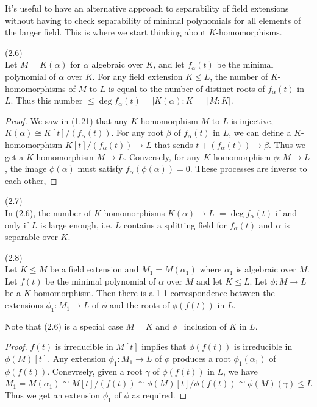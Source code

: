 \documentclass[a4paper]{article}
\begin{document}
\begin{rem}
It's useful to have an alternative approach to separability of field extensions without having to check separability of minimal polynomials for all elements of the larger field. This is where we start thinking about $K$-homomorphisms.
\end{rem}

\begin{lemma} (2.6)\\
Let $M = K(\alpha)$ for $\alpha$ algebraic over $K$, and let $f_\alpha(t)$ be the minimal polynomial of $\alpha$ over $K$. For any field extension $K \leq L$, the number of $K$-homomorphisms of $M$ to $L$ is equal to the number of distinct roots of $f_\alpha(t)$ in $L$. Thus this number $\leq \deg f_\alpha(t) = |K(\alpha):K| = |M:K|$.
\begin{proof}
We saw in (1.21) that any $K$-homomorphism $M$ to $L$ is injective, $K(\alpha) \cong K[t]/(f_\alpha(t))$. For any root $\beta$ of $f_\alpha(t)$ in $L$, we can define a $K$-homomorphism $K[t]/(f_\alpha(t)) \to L$ that sends $t+(f_\alpha(t)) \to \beta$. Thus we get a $K$-homomorphism $M \to L$. Conversely, for any $K$-homomorphism $\phi:M \to L$, the image $\phi(\alpha)$ must satisfy $f_\alpha(\phi(\alpha)) = 0$. These processes are inverse to each other,
\end{proof}
\end{lemma}

\begin{coro}(2.7)\\
In (2.6), the number of $K$-homomorphisms $K(\alpha) \to L$ $= \deg f_\alpha(t)$ if and only if $L$ is large enough, i.e. $L$ contains a splitting field for $f_\alpha(t)$ and $\alpha$ is separable over $K$.
\end{coro}

\begin{lemma}(2.8)\\
Let $K \leq M$ be a field extension and $M_1 = M(\alpha_1)$ where $\alpha_1$ is algebraic over $M$. Let $f(t)$ be the minimal polynomial of $\alpha$ over $M$ and let $K \leq L$. Let $\phi:M \to L$ be a $K$-homomorphism. Then there is a 1-1 correspondence between the extensions $\phi_1:M_1 \to L$ of $\phi$ and the roots of $\phi(f(t))$ in $L$.

Note that (2.6) is a special case $M=K$ and $\phi$=inclusion of $K$ in $L$.
\begin{proof}
$f(t)$ is irreducible in $M[t]$ implies that $\phi(f(t))$ is irreducible in $\phi(M)[t]$. Any extension $\phi_1:M_1 \to L$ of $\phi$ produces a root $\phi_1(\alpha_1)$ of $\phi(f(t))$. Conevrsely, given a root $\gamma$ of $\phi(f(t))$ in $L$, we have $M_1 = M(\alpha_1) \cong M[t] / (f(t)) \cong \phi(M)[t]/\phi(f(t)) \cong \phi(M)(\gamma) \leq L$ Thus we get an extension $\phi_1$ of $\phi$ as required.
\end{proof}
\end{lemma}
\end{document}

